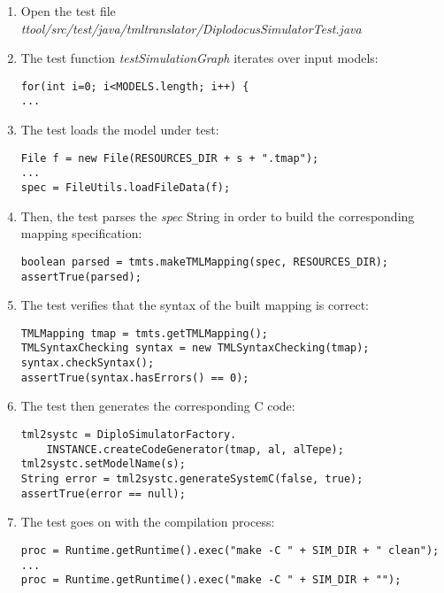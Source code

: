 \documentclass[12pt]{article}
\begin{document}
\begin{enumerate}
\item Open the test file \textit{ttool/src/test/java/tmltranslator/DiplodocusSimulatorTest.java}\\

\item The test function \textit{testSimulationGraph} iterates over input models:

\begin{verbatim}
for(int i=0; i<MODELS.length; i++) {
...
\end{verbatim}

\item The test loads the model under test:

\begin{verbatim}
File f = new File(RESOURCES_DIR + s + ".tmap");
...
spec = FileUtils.loadFileData(f);
\end{verbatim}

\item Then, the test parses the \textit{spec} String in order to build the corresponding mapping specification:
\begin{verbatim}
boolean parsed = tmts.makeTMLMapping(spec, RESOURCES_DIR);
assertTrue(parsed);
\end{verbatim}

\item The test verifies that the syntax of the built mapping is correct:
\begin{verbatim}
TMLMapping tmap = tmts.getTMLMapping();
TMLSyntaxChecking syntax = new TMLSyntaxChecking(tmap);
syntax.checkSyntax();
assertTrue(syntax.hasErrors() == 0);
\end{verbatim}

\item The test then generates the corresponding C code:
\begin{verbatim}
tml2systc = DiploSimulatorFactory.
    INSTANCE.createCodeGenerator(tmap, al, alTepe);
tml2systc.setModelName(s);
String error = tml2systc.generateSystemC(false, true);
assertTrue(error == null);
\end{verbatim}

\item The test goes on with the compilation process:
\begin{verbatim}
proc = Runtime.getRuntime().exec("make -C " + SIM_DIR + " clean");
...
proc = Runtime.getRuntime().exec("make -C " + SIM_DIR + "");
\end{verbatim}


\end{enumerate}
\end{document}
